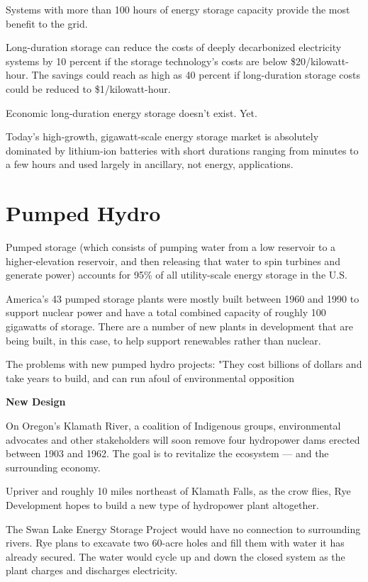 \documentclass[
]{book}
\begin{document}
Systems with more than 100 hours of energy storage capacity provide the most benefit to the grid.

Long-duration storage can reduce the costs of deeply decarbonized electricity systems by 10 percent if the storage technology's costs are below \$20/kilowatt-hour. The savings could reach as high as 40 percent if long-duration storage costs could be reduced to \$1/kilowatt-hour.

Economic long-duration energy storage doesn't exist. Yet.

Today's high-growth, gigawatt-scale energy storage market is absolutely dominated by lithium-ion batteries with short durations ranging from minutes to a few hours and used largely in ancillary, not energy, applications.

\hypertarget{pumped-hydro}{%
\section{Pumped Hydro}\label{pumped-hydro}}

Pumped storage (which consists of pumping water from a low reservoir to a higher-elevation reservoir, and then releasing that water to spin turbines and generate power) accounts for 95\% of all utility-scale energy storage in the U.S.

America's 43 pumped storage plants were mostly built between 1960 and 1990 to support nuclear power and have a total combined capacity of roughly 100 gigawatts of storage. There are a number of new plants in development that are being built, in this case, to help support renewables rather than nuclear.

The problems with new pumped hydro projects: "They cost billions of dollars and take years to build, and can run afoul of environmental opposition

\textbf{New Design}

On Oregon's Klamath River, a coalition of Indigenous groups, environmental advocates and other stakeholders will soon remove four hydropower dams erected between 1903 and 1962. The goal is to revitalize the ecosystem --- and the surrounding economy.

Upriver and roughly 10 miles northeast of Klamath Falls, as the crow flies, Rye Development hopes to build a new type of hydropower plant altogether.

The Swan Lake Energy Storage Project would have no connection to surrounding rivers. Rye plans to excavate two 60-acre holes and fill them with water it has already secured. The water would cycle up and down the closed system as the plant charges and discharges electricity.
\end{document}
